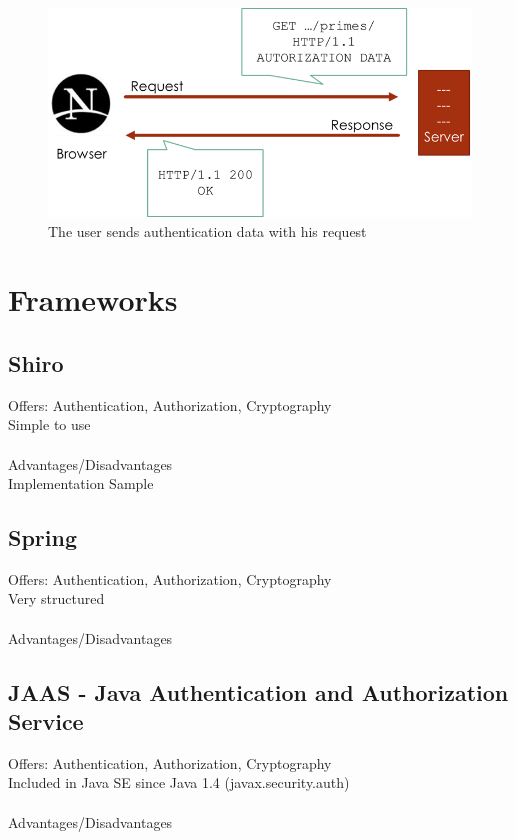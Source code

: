 \documentclass[12pt,a4paper]{report}
\begin{document}
\begin{figure}[h!]
	\centering
	\includegraphics[width=1\linewidth]{res/Authorized}
	\caption{The user sends authentication data with his request}
	\label{fig:Authorized}
\end{figure}

\section{Frameworks}
\subsection{Shiro}
Offers: Authentication, Authorization, Cryptography\\
Simple to use\\\\
Advantages/Disadvantages\\
Implementation Sample

\subsection{Spring}
Offers: Authentication, Authorization, Cryptography\\
Very structured\\\\
Advantages/Disadvantages\\

\subsection{JAAS - Java Authentication and Authorization Service}
Offers: Authentication, Authorization, Cryptography\\
Included in Java SE since Java 1.4 (javax.security.auth)\\\\
Advantages/Disadvantages\\
\end{document}
